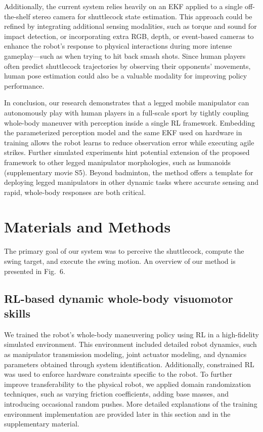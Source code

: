 \documentclass[9pt,twocolumn,twoside]{osajnl}
\begin{document}
Additionally, the current system relies heavily on an \ac{EKF} applied to a single off-the-shelf stereo camera for shuttlecock state estimation. This approach could be refined by integrating additional sensing modalities, such as torque and sound for impact detection, or incorporating extra RGB, depth, or event-based cameras to enhance the robot's response to physical interactions during more intense gameplay—such as when trying to hit back smash shots. Since human players often predict shuttlecock trajectories by observing their opponents' movements, human pose estimation could also be a valuable modality for improving policy performance.

In conclusion, our research demonstrates that a legged mobile manipulator can autonomously play with human players in a full-scale sport by tightly coupling whole-body maneuver with perception inside a single \ac{RL} framework. Embedding the parameterized perception model and the same \ac{EKF} used on hardware in training allows the robot learns to reduce observation error while executing agile strikes. Further simulated experiments hint potential extension of the proposed framework to other legged manipulator morphologies, such as humanoids (supplementary movie S5). Beyond badminton, the method offers a template for deploying legged manipulators in other dynamic tasks where accurate sensing and rapid, whole-body responses are both critical.

\section*{Materials and Methods}



The primary goal of our system was to perceive the shuttlecock, compute the swing target, and execute the swing motion. An overview of our method is presented in Fig.~6.

\subsection*{RL-based dynamic whole-body visuomotor skills}
We trained the robot's whole-body maneuvering policy using \ac{RL} in a high-fidelity simulated environment. This environment included detailed robot dynamics, such as manipulator transmission modeling, joint actuator modeling, and dynamics parameters obtained through system identification. Additionally, constrained \ac{RL} was used to enforce hardware constraints specific to the robot. To further improve transferability to the physical robot, we applied domain randomization techniques, such as varying friction coefficients, adding base masses, and introducing occasional random pushes. More detailed explanations of the training environment implementation are provided later in this section and in the supplementary material.
\end{document}
